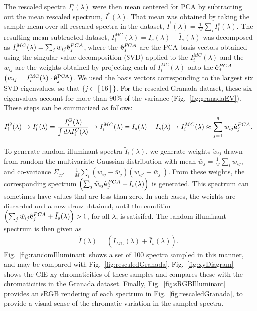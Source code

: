 \documentclass{jov}
\begin{document}
The rescaled spectra $I_i^s(\lambda)$ were then mean centered for PCA by subtracting out the mean 
rescaled spectrum, $\bar{I}^{s}(\lambda)$. That mean was obtained
by taking the sample mean over all rescaled spectra in the dataset, $\bar{I}^{s}(\lambda) = \frac{1}{M}\sum_i{I_i^s(\lambda)}$. 
The resulting mean subtracted dataset, $I_i^{MC}(\lambda) = I_{s}(\lambda) - \bar{I}_{s}(\lambda)$
was decomposed as $I_i^{MC}(\lambda) = \sum_j w_{ij}\hat{{\bf e}}_j^{PCA}$, 
where the $\hat{{\bf e}}_j^{PCA}$ are the PCA basis vectors obtained using the
singular value decomposition (SVD) applied to the $I_i^{MC}(\lambda)$ and
the $w_{ij}$ are the weights obtained by projecting each of $I_i^{MC}(\lambda)$ onto the  $\hat{{\bf e}}_j^{PCA}$ $\left( w_{ij} = I_i^{\rm MC}(\lambda)\cdot {\bf \hat{e}}_j^{\rm PCA}\right)$.
We used the basis vectors corresponding to
the largest six SVD eigenvalues, so that $\{j \in [16]\}$.
For the rescaled Granada dataset, these six  eigenvalues account for more than $90\%$ of the variance (Fig.~\ref{fig:granadaEV}).
These steps
can be summarized as follows:
\begin{align}
I^G_i(\lambda) \rightarrow I_i^s(\lambda) = \frac{I^G_i(\lambda)}{\int d\lambda I^G_i(\lambda)} \rightarrow I_i^{MC}(\lambda) = I_{s}(\lambda) - \bar{I}_{s}(\lambda) \rightarrow I_i^{MC}(\lambda) \approx \sum_{j = 1}^6 w_{ij}\hat{{\bf e}}_j^{PCA}.
\end{align}

To generate random illuminant spectra $\tilde{I}_i(\lambda)$, we generate weights $\tilde{w}_{ij}$ drawn from random 
the multivariate 
Gaussian distribution with mean $\bar{w}_j = \frac{1}{M}\sum_i w_{ij}$, 
and co-variance $\Sigma_{jj'} = \frac{1}{M} \sum_i \left(w_{ij} -\bar{w}_j\right)\left(w_{ij'} -\bar{w}_{j'}\right) $.
From these weights, the corresponding spectrum $\left( \sum_j \tilde{w}_{ij} \hat{{\bf e}}_j^{PCA} +  \bar{I}_{s} (\lambda)\right)$ is generated.
This spectrum can sometimes have values that are less than zero.  In such cases, the weights are discarded and a new draw obtained, until
the condition $\left( \sum_j \tilde{w}_{ij} \hat{{\bf e}}_j^{PCA} +  \bar{I}_{s} (\lambda)\right) > 0$, for all $\lambda$, is satisifed.
The random illuminant spectrum is then given as
\begin{align}
\tilde{I}(\lambda) = \left( \tilde{I}_{MC}(\lambda) + \bar{I}_{s}(\lambda)\right).
\end{align}
Fig.~\ref{fig:randomIlluminant} shows a set of 100 spectra sampled in this manner, and may be compared with Fig.~\ref{fig:rescaledGranada}.  Fig.~\ref{fig:xyDiagram} shows the CIE xy chromaticities of these samples and compares these with the chromaticities in the Granada dataset.  Finally, Fig.~\ref{fig:sRGBIlluminant} provides an sRGB rendering of each spectrum in Fig.~\ref{fig:rescaledGranada}, to provide a visual sense of the chromatic variation in the sampled spectra.
\end{document}

